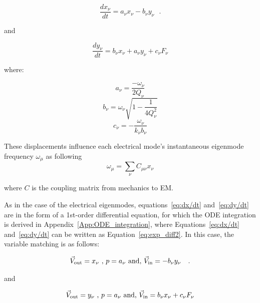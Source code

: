 \documentclass[a4paper,12pt]{article}
\newcommand{\be}{\begin{equation}}
\newcommand{\ee}{\end{equation}}
\begin{document}
\begin{equation}
  \frac{dx_{\nu}}{dt} = a_{\nu}x_{\nu} - b_{\nu}y_{\nu}~~~.
  \label{eq:dx/dt}
\end{equation}

\noindent and

\begin{equation}
  \frac{dy_{\nu}}{dt} = b_{\nu}x_{\nu} + a_{\nu}y_{\nu} + c_{\nu}F_{\nu}
  \label{eq:dy/dt}
\end{equation}

\noindent where: 

\be
a_{\nu} =  \frac{-\omega_{\nu}}{2Q_{\nu}} 
\ee
\be
b_{\nu} = \omega_{\nu} \sqrt{1 - \frac{1}{4Q_{\nu}^{2}}} 
\ee
\be
c_{\nu} = -\frac{\omega_{\nu}}{k_{\nu}b_{\nu}}
\ee

These displacements influence each electrical mode's instantaneous eigenmode frequency $\omega_{\mu}$ as following
\be
\label{eq_wmu}
\omega_\mu = \sum_\nu C_{\mu\nu} x_\nu
\ee

\noindent where $C$ is the coupling matrix from mechanics to EM.

As in the case of the electrical eigenmodes, equations~\ref{eq:dx/dt} and~\ref{eq:dy/dt} are in the form of a 1st-order differential equation, for which the ODE integration is derived in Appendix~\ref{App:ODE_integration}, where Equations~\ref{eq:dx/dt} and~\ref{eq:dy/dt} can be written as Equation~\ref{eq:exp_diff2}. In this case, the variable matching is as follows:

\begin{equation}
 \vec V_{\rm out} = x_{\nu} \mbox{ , } p = a_{\nu} \mbox{ and, } \vec V_{\rm in} = -b_{\nu}y_{\nu}~~~.
\end{equation}

\noindent and

\begin{equation}
 \vec V_{\rm out} = y_{\nu} \mbox{ , } p = a_{\nu} \mbox{ and, } \vec V_{\rm in} = b_{\nu}x_{\nu} + c_{\nu}F_{\nu}
\end{equation}
\end{document}
